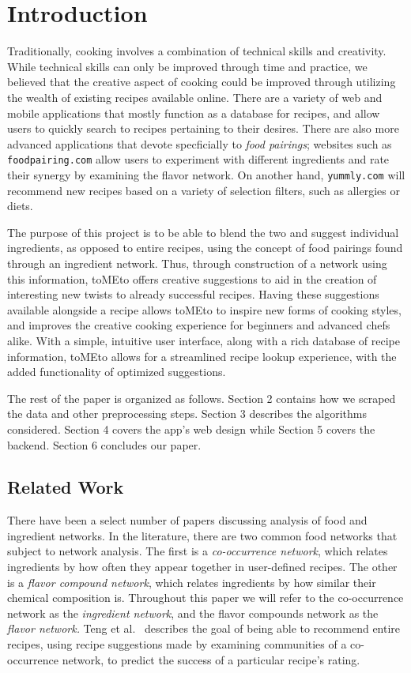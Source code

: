 \documentclass{acm_proc_article-sp}
\begin{document}
\section{Introduction}
Traditionally, cooking involves a combination of technical skills and creativity. While technical skills can only be improved through time and practice, we believed that the creative aspect of cooking could be improved through utilizing the wealth of existing recipes available online. There are a variety of web and mobile applications
that mostly function as a database for recipes, and allow users to quickly search to recipes pertaining to their desires. There are also more advanced applications that devote specficially to \textit{food pairings}; websites such as \texttt{foodpairing.com} allow users to experiment with different ingredients and rate their synergy by examining the flavor network. On another hand, \texttt{yummly.com} will recommend new recipes based on a variety of selection filters, such as allergies or diets. 

The purpose of this project is to be able to blend the two and suggest individual ingredients, as opposed to entire recipes, using the concept of food pairings found through an ingredient network.
 Thus, through construction of a network using this information, toMEto offers creative suggestions to aid in the creation of interesting new twists to already successful recipes. Having these suggestions available alongside a recipe allows toMEto to inspire new forms of cooking styles, and improves the creative cooking experience for beginners and advanced chefs alike. With a simple, intuitive user interface, along with a rich database of recipe information, toMEto allows for a streamlined recipe lookup experience, with the added functionality of optimized suggestions. 

The rest of the paper is organized as follows. Section 2 contains how we scraped the data and other preprocessing steps. Section 3 describes the algorithms considered. Section 4 covers the app's web design while Section 5 covers the backend. Section 6 concludes our paper. 

\subsection{Related Work}

There have been a select number of papers discussing analysis of food and ingredient networks. In the literature, there are two common food networks that subject to network analysis. The first is a \textit{co-occurrence network}, which relates ingredients by how often they appear together in user-defined recipes. The other is a \textit{flavor compound network}, which relates ingredients by how similar their chemical composition is. Throughout this paper we will refer to the co-occurrence network as the \textit{ingredient network}, and the flavor compounds network as the \textit{flavor network.}
Teng et al.~\cite{recommend} describes the goal of being able to recommend entire recipes, using recipe suggestions made by examining communities of a co-occurrence network, to predict the success of a particular recipe's rating. 
\end{document}
